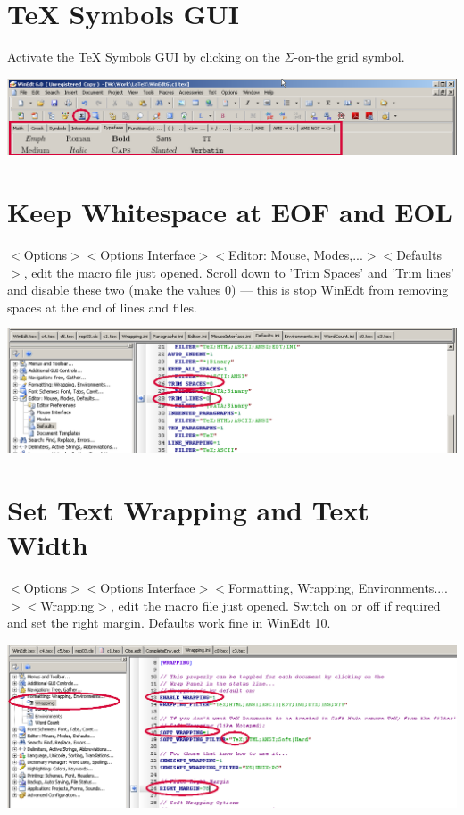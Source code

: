\section{TeX Symbols GUI}

Activate the TeX Symbols GUI by clicking on the $\Sigma$-on-the grid symbol.

\centerline{\includegraphics[bb= 0 0 1037 179,width=\textwidth]{eps/texsymbolsgiu.png}}



\section{Keep Whitespace at EOF and EOL}

$<$Options$>$$<$Options Interface$>$$<$Editor: Mouse, Modes,...$>$$<$Defaults$>$, edit the macro file just opened. Scroll down to 'Trim Spaces' and 'Trim lines' and disable these two (make the values 0) --- this is stop WinEdt from removing spaces at the end of lines and files.

\centerline{\includegraphics[bb= 0 0 1037 288,width=\textwidth]{eps/trimeoleof.png}}


\section{Set Text Wrapping and Text Width}

$<$Options$>$$<$Options Interface$>$$<$Formatting, Wrapping, Environments....$>$$<$Wrapping$>$, edit the macro file just opened.
Switch on or off if required and set the right margin. Defaults work fine in WinEdt 10.

\centerline{\includegraphics[bb= 0 0 1093 397,width=\textwidth]{eps/wrapping.png}}

